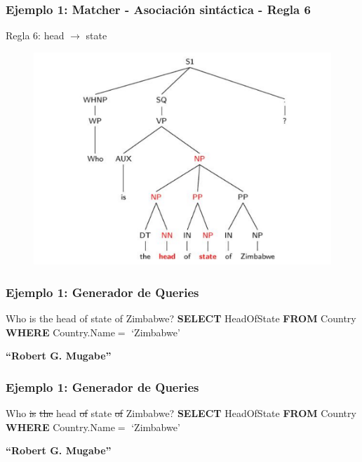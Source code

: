 \begin{frame}[t]
\frametitle{Ejemplo 1: Matcher - Asociación sintáctica - Regla 6}
\Large{Regla 6: head $\rightarrow$ state}
\begin{center}

\begin{figure}
  \centering
    \includegraphics[scale=.5]{graficos/presentacion/ejemplo-charniak-1}
\end{figure}
\end{center}
\end{frame}

\begin{frame}[t]
\frametitle{Ejemplo 1: Generador de Queries}
\Large{Who is the head of state of Zimbabwe? 
\bigskip
\newline
{\color{white}\textbf{{\color{white}SELECT}} HeadOfState \newline
{\color{white}\textbf{FROM}} Country \newline
{\color{white}\textbf{WHERE}} Country.Name$=$ {\color{white}`Zimbabwe'}
}}

\bigskip

{\color{white}\textbf{``Robert G. Mugabe''}}

\end{frame}



\begin{frame}[t]
\frametitle{Ejemplo 1: Generador de Queries}
\Large{{\color{blue}Who} \st{is} \st{the} {\color{blue}head} \st{of} {\color{blue}state} \st{of} {\color{purple}Zimbabwe}? 
\bigskip
\newline
{\color{white}\textbf{{\color{white}SELECT}} HeadOfState \newline
{\color{white}\textbf{FROM}} Country \newline
{\color{white}\textbf{WHERE}} Country.Name$=$ {\color{white}`Zimbabwe'}
}}

\bigskip

{\color{white}\textbf{``Robert G. Mugabe''}}

\end{frame}

